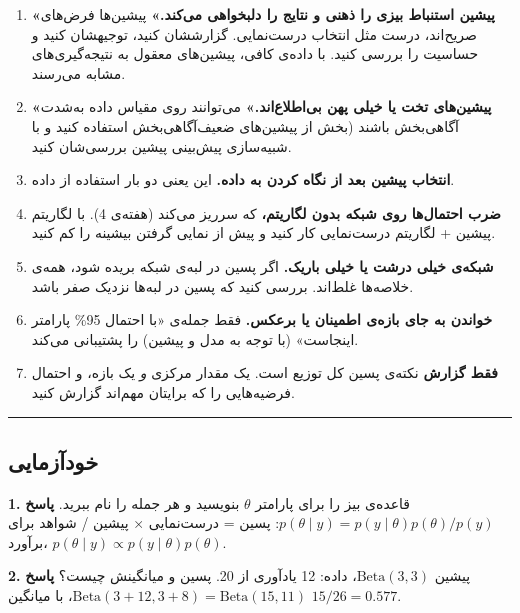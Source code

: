 \begin{enumerate}
\def\labelenumi{\arabic{enumi}.}
\tightlist
\item
  \textbf{«پیشین استنباط بیزی را ذهنی و نتایج را دلبخواهی می‌کند.»}
  پیشین‌ها فرض‌های صریح‌اند، درست مثل انتخاب درست‌نمایی. گزارششان کنید،
  توجیهشان کنید و حساسیت را بررسی کنید. با داده‌ی کافی، پیشین‌های معقول به
  نتیجه‌گیری‌های مشابه می‌رسند.
\item
  \textbf{«پیشین‌های تخت یا خیلی پهن بی‌اطلاع‌اند.»} می‌توانند روی مقیاس
  داده به‌شدت آگاهی‌بخش باشند (بخش  از پیشین‌های ضعیف‌آگاهی‌بخش
  استفاده کنید و با شبیه‌سازی پیش‌بینی پیشین بررسی‌شان کنید.
\item
  \textbf{انتخاب پیشین بعد از نگاه کردن به داده.} این یعنی دو بار
  استفاده از داده.
\item
  \textbf{ضرب احتمال‌ها روی شبکه بدون لگاریتم،} که سرریز می‌کند (هفته‌ی 4).
  با لگاریتم پیشین + لگاریتم درست‌نمایی کار کنید و پیش از نمایی گرفتن
  بیشینه را کم کنید.
\item
  \textbf{شبکه‌ی خیلی درشت یا خیلی باریک.} اگر پسین در لبه‌ی شبکه بریده
  شود، همه‌ی خلاصه‌ها غلط‌اند. بررسی کنید که پسین در لبه‌ها نزدیک صفر باشد.
\item
  \textbf{خواندن  به جای بازه‌ی اطمینان یا برعکس.}
  فقط  جمله‌ی «با احتمال 95\% پارامتر اینجاست» (با
  توجه به مدل و پیشین) را پشتیبانی می‌کند.
\item
  \textbf{فقط گزارش } نکته‌ی پسین کل توزیع است. یک مقدار مرکزی
  \emph{و} یک بازه، و احتمال فرضیه‌هایی را که برایتان مهم‌اند گزارش کنید.
\end{enumerate}

\begin{center}\rule{0.5\linewidth}{0.5pt}\end{center}

\subsection{خودآزمایی}

\textbf{1.} قاعده‌ی بیز را برای پارامتر \(\theta\) بنویسید و هر جمله را
نام ببرید. \textbf{پاسخ}
\(p(\theta\mid y) = p(y\mid\theta)p(\theta)/p(y)\): پسین = درست‌نمایی ×
پیشین / شواهد  برای برآورد،
\(p(\theta\mid y) \propto p(y\mid\theta)p(\theta)\).

\textbf{2.} پیشین \(\mathrm{Beta}(3, 3)\)، داده: 12 یادآوری از 20. پسین
و میانگینش چیست؟ \textbf{پاسخ}
\(\mathrm{Beta}(3 + 12,\allowbreak 3 + 8) = \mathrm{Beta}(15,\allowbreak 11)\)، با میانگین
\(15/26 = 0.577\).

